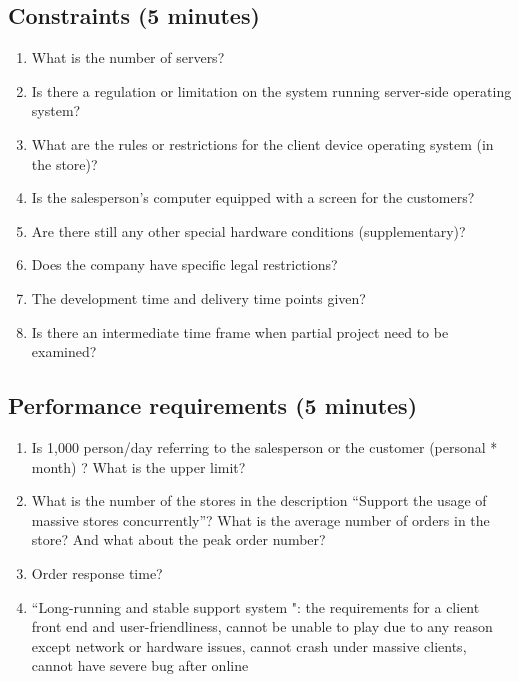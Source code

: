 \documentclass[a4paper]{report}
\begin{document}
\subsection{Constraints (5 minutes)}
\begin{enumerate}
\item What is the number of servers? 
\item Is there a regulation or limitation on the system running server-side operating system? 
\item What are the rules or restrictions for the client device operating system (in the store)? 
\item Is the salesperson's computer equipped with a screen for the customers?
\item Are there still any other special hardware conditions (supplementary)? 
\item Does the company have specific legal restrictions? 
\item The development time and delivery time points given? 
\item Is there an intermediate time frame when partial project need to be examined?
\end{enumerate}
 \subsection{Performance requirements (5 minutes)}
 \begin{enumerate}
\item Is 1,000 person/day referring to the salesperson or the customer (personal * month) ? What is the upper limit? 
\item What is the number of the stores in the description ``Support the usage of massive stores concurrently''?  What is the average number of orders in the store? And what about the peak order number? 
\item Order response time? 
\item ``Long-running and stable support system ": the requirements for a client front end and user-friendliness, cannot be unable to play due to any reason except network or hardware issues, cannot crash under massive clients, cannot have severe bug after online
\end{enumerate}
\end{document}
